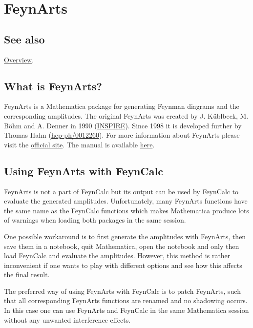 \documentclass[../FeynCalcManual.tex]{subfiles}
\begin{document}
\hypertarget{feynarts}{
\section{FeynArts}\label{feynarts}}

\subsection{See also}

\hyperlink{toc}{Overview}.

\hypertarget{what-is-feynarts}{%
\subsection{What is FeynArts?}\label{what-is-feynarts}}

FeynArts is a Mathematica package for generating Feynman diagrams and
the corresponding amplitudes. The original FeynArts was created by J.
Küblbeck, M. Böhm and A. Denner in 1990
(\href{http://inspirehep.net/record/27276}{INSPIRE}). Since 1998 it is
developed further by Thomas Hahn
(\href{http://arxiv.org/abs/hep-ph/0012260}{hep-ph/0012260}). For more
information about FeynArts please visit the
\href{http://www.feynarts.de/}{official site}. The manual is available
\href{http://www.feynarts.de/FA3Guide.pdf}{here}.

\hypertarget{using-feynarts-with-feyncalc}{%
\subsection{Using FeynArts with
FeynCalc}\label{using-feynarts-with-feyncalc}}

FeynArts is not a part of FeynCalc but its output can be used by
FeynCalc to evaluate the generated amplitudes. Unfortunately, many
FeynArts functions have the same name as the FeynCalc functions which
makes Mathematica produce lots of warnings when loading both packages in
the same session.

One possible workaround is to first generate the amplitudes with
FeynArts, then save them in a notebook, quit Mathematica, open the
notebook and only then load FeynCalc and evaluate the amplitudes.
However, this method is rather inconvenient if one wants to play with
different options and see how this affects the final result.

The preferred way of using FeynArts with FeynCalc is to patch FeynArts,
such that all corresponding FeynArts functions are renamed and no
shadowing occurs. In this case one can use FeynArts and FeynCalc in the
same Mathematica session without any unwanted interference effects.
\end{document}
